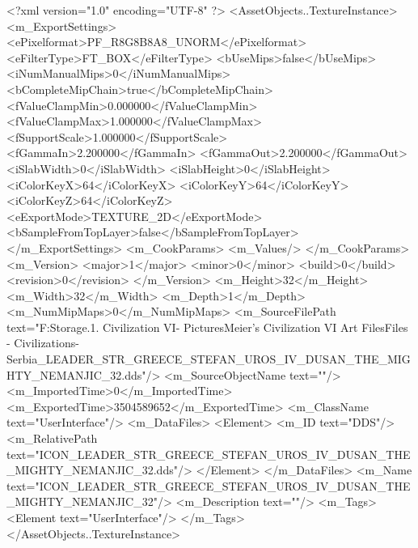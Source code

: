 <?xml version="1.0" encoding="UTF-8" ?>
<AssetObjects..TextureInstance>
	<m_ExportSettings>
		<ePixelformat>PF_R8G8B8A8_UNORM</ePixelformat>
		<eFilterType>FT_BOX</eFilterType>
		<bUseMips>false</bUseMips>
		<iNumManualMips>0</iNumManualMips>
		<bCompleteMipChain>true</bCompleteMipChain>
		<fValueClampMin>0.000000</fValueClampMin>
		<fValueClampMax>1.000000</fValueClampMax>
		<fSupportScale>1.000000</fSupportScale>
		<fGammaIn>2.200000</fGammaIn>
		<fGammaOut>2.200000</fGammaOut>
		<iSlabWidth>0</iSlabWidth>
		<iSlabHeight>0</iSlabHeight>
		<iColorKeyX>64</iColorKeyX>
		<iColorKeyY>64</iColorKeyY>
		<iColorKeyZ>64</iColorKeyZ>
		<eExportMode>TEXTURE_2D</eExportMode>
		<bSampleFromTopLayer>false</bSampleFromTopLayer>
	</m_ExportSettings>
	<m_CookParams>
		<m_Values/>
	</m_CookParams>
	<m_Version>
		<major>1</major>
		<minor>0</minor>
		<build>0</build>
		<revision>0</revision>
	</m_Version>
	<m_Height>32</m_Height>
	<m_Width>32</m_Width>
	<m_Depth>1</m_Depth>
	<m_NumMipMaps>0</m_NumMipMaps>
	<m_SourceFilePath text="F:\Mod Storage\2.1. Civilization VI\Mods\Archive - Pictures\Sid Meier's Civilization VI Art Files\Art Files - Civilizations\Civilization - Serbia\ICON_LEADER_STR_GREECE_STEFAN_UROS_IV_DUSAN_THE_MIGHTY_NEMANJIC_32.dds"/>
	<m_SourceObjectName text=""/>
	<m_ImportedTime>0</m_ImportedTime>
	<m_ExportedTime>3504589652</m_ExportedTime>
	<m_ClassName text="UserInterface"/>
	<m_DataFiles>
		<Element>
			<m_ID text="DDS"/>
			<m_RelativePath text="ICON_LEADER_STR_GREECE_STEFAN_UROS_IV_DUSAN_THE_MIGHTY_NEMANJIC_32.dds"/>
		</Element>
	</m_DataFiles>
	<m_Name text="ICON_LEADER_STR_GREECE_STEFAN_UROS_IV_DUSAN_THE_MIGHTY_NEMANJIC_32"/>
	<m_Description text=""/>
	<m_Tags>
		<Element text="UserInterface"/>
	</m_Tags>
</AssetObjects..TextureInstance>

